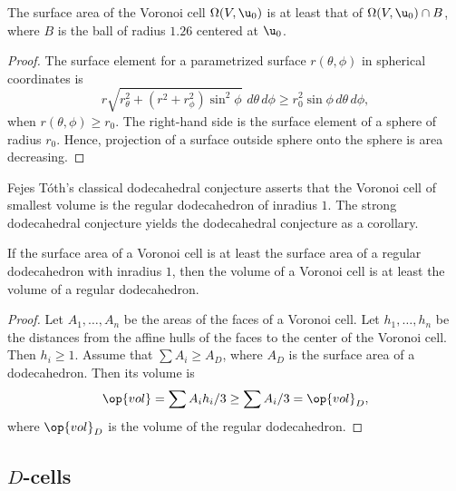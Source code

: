 \begin{lemma}[]  %
  The surface area of the Voronoi cell $\Omega(V, \u_0)$ is at least
  that of $\Omega(V, \u_0)\cap B$, where $B$ is the ball of radius
  $1.26$ centered at $ \u_0$.
\end{lemma}
%
%

\begin{proof} The surface element for a parametrized surface
  $r(\theta,\phi)$ in spherical coordinates is
\[
%
  r \sqrt{r_\theta^2 + (r^2 + r_\phi^2)\sin^2\phi } \,\,d\theta\,d\phi 
\ge r_0^2 \sin\phi\, d\theta\,d\phi,
\]
when $r(\theta,\phi)\ge r_0$.  The right-hand side is the surface
element of a sphere of radius $r_0$.  Hence, projection of a surface
outside sphere onto the sphere is area decreasing.
\end{proof}


Fejes T\'oth's classical dodecahedral conjecture asserts that the
Voronoi cell of smallest volume is the regular dodecahedron of
inradius $1$.  %
%
The strong dodecahedral conjecture yields the dodecahedral conjecture
as a corollary.

\begin{lemma}[]
  If the surface area of a Voronoi cell is at least the surface area
  of a regular dodecahedron with inradius $1$, then the volume of a
  Voronoi cell is at least the volume of a regular dodecahedron.
\end{lemma}

\begin{proof} Let $A_1,\ldots,A_n$ be the areas of the faces of a
  Voronoi cell.  Let $h_1,\ldots,h_n$ be the distances from the affine
  hulls of the faces to the center of the Voronoi cell.  Then $h_i\ge
  1$.  Assume that $\sum A_i \ge A_D$, where $A_D$ is the surface area
  of a dodecahedron.  Then its volume is
\[
\op{vol} = \sum A_i h_i/3 \ge \sum A_i/3 = \op{vol}_D,
\]
where $\op{vol}_D$ is the volume of the regular dodecahedron.
\end{proof}
%
%
%


\subsection{$D$-cells}



